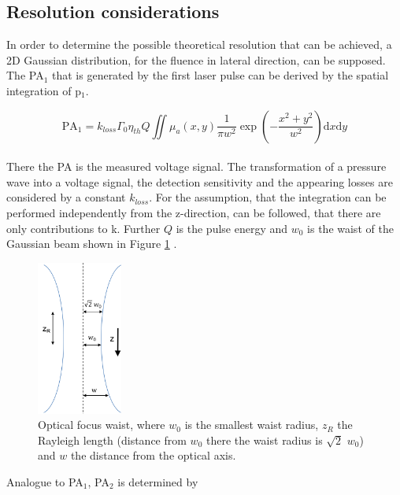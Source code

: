 \subsection{Resolution considerations}
\label{sec:resConGR}

In order to determine the possible theoretical resolution that can be achieved, a 2D Gaussian distribution, for the fluence in lateral direction, can be supposed. The PA$_1$ that is generated by the first laser pulse can be derived by the spatial integration of p$_1$. 

\begin{equation}
	\mathrm{PA}_1 = k_{loss} \Gamma_0 \eta_{th} Q \iint\mu_a(x,y) \frac{1}{\pi w^2} \exp{\left(-\frac{x^2+y^2}{w^2}\right)} \mathrm{d}x\mathrm{d}y
	\label{eq:PA1}
\end{equation}
\\
There the PA is the measured voltage signal. The transformation of a pressure wave into a voltage signal, the detection sensitivity and the appearing losses are considered by a constant $k_{loss}$. For the assumption, that the integration can be performed independently from the z-direction, can be followed, that there are only contributions to k. Further $Q$ is the pulse energy and $w_0$ is the waist of the Gaussian beam shown in Figure \ref{fig:focusWaist} \cite{Bessel:GRPAM, Wang:GRPAM}. 

\begin{figure}[H]
	\centering
	\includegraphics[width = 0.25\textwidth, height=0.3\textheight]{03_GR-PAM_theory/images/focusWaist.png}
	\caption{Optical focus waist, where $w_0$ is the smallest waist radius, $z_R$ the Rayleigh length (distance from $w_0$ there the waist radius is $\sqrt{2}$ $w_0$) and $w$ the distance from the optical axis.}
	\label{fig:focusWaist}
\end{figure}

Analogue to PA$_1$, PA$_2$ is determined by

